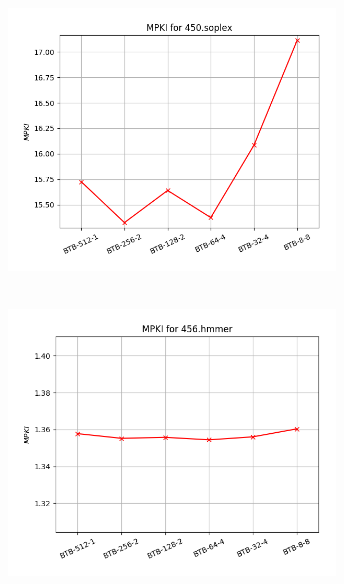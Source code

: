   \begin{minipage}{\textwidth}
      \begin{center}
         \\
         \vspace{3mm}
         \includegraphics[width=0.65\textwidth, frame]{./graphs/4-3/450-soplex.png}
         \vspace{6mm}
      \end{center}
   \end{minipage}

   \begin{minipage}{\textwidth}
      \begin{center}
         \\
         \vspace{3mm}
         \includegraphics[width=0.65\textwidth, frame]{./graphs/4-3/456-hmmer.png}
         \vspace{6mm}
      \end{center}
   \end{minipage}

